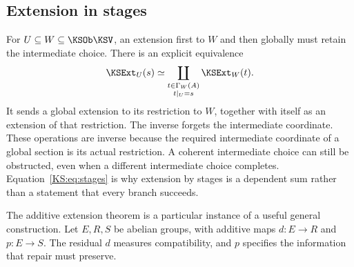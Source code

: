 \subsection{Extension in stages}
For \(U\subseteq W\subseteq\KSOb\KSV\), an extension first to \(W\) and then globally must retain the intermediate choice. There is an explicit equivalence
\begin{equation}\label{KS:eq:stages}
 \KSExt_U(s)\simeq
 \coprod_{\substack{t\in\Gamma_W(A)\\t|_U=s}}\KSExt_W(t).
\end{equation}
It sends a global extension to its restriction to \(W\), together with itself as an extension of that restriction. The inverse forgets the intermediate coordinate. These operations are inverse because the required intermediate coordinate of a global section is its actual restriction. A coherent intermediate choice can still be obstructed, even when a different intermediate choice completes. Equation~\eqref{KS:eq:stages} is why extension by stages is a dependent sum rather than a statement that every branch succeeds.

\label{KS:sec:protected}
The additive extension theorem is a particular instance of a useful general construction. Let \(E,R,S\) be abelian groups, with additive maps \(d:E\to R\) and \(p:E\to S\). The residual \(d\) measures compatibility, and \(p\) specifies the information that repair must preserve.

